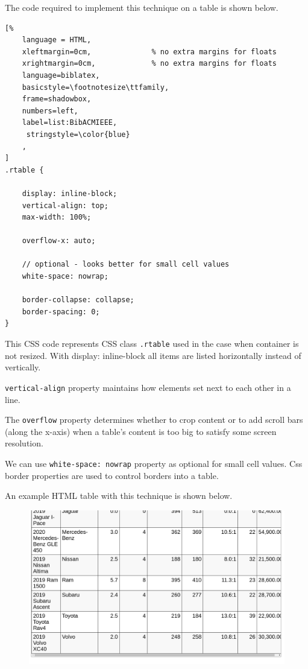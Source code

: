 \begin{itemize}
The code required to implement this technique on a table is shown below.

\begin{lstlisting}[%
    language = HTML,
    xleftmargin=0cm,              % no extra margins for floats
    xrightmargin=0cm,             % no extra margins for floats
    language=biblatex,
    basicstyle=\footnotesize\ttfamily,
    frame=shadowbox,
    numbers=left,
    label=list:BibACMIEEE,
     stringstyle=\color{blue}
    ,
]
.rtable {

    display: inline-block;
    vertical-align: top;
    max-width: 100%;

    overflow-x: auto;

    // optional - looks better for small cell values
    white-space: nowrap;

    border-collapse: collapse;
    border-spacing: 0;
}

\end{lstlisting}

This CSS code represents CSS class \texttt{.rtable} used in the case when container is not resized.
With display: inline-block all items are listed horizontally instead of vertically.

\texttt{vertical-align} property maintains how elements set next to each other in a line.

The \texttt{overflow} property determines whether to crop content or to add scroll bars (along the x-axis) when a table's content is too big to satisfy some screen resolution.

We can use \texttt{white-space: nowrap} property as optional for small cell values.
Css border properties are used to control borders into a table\parencite{HS_1}.

An example HTML table with this technique is shown below.
\begin{figure}[H]
    \centering

    {%
    \includegraphics[width=1\linewidth]
    {horizontal.png}%
    \label{alig1}%
    }



\end{figure}
\end{itemize}

